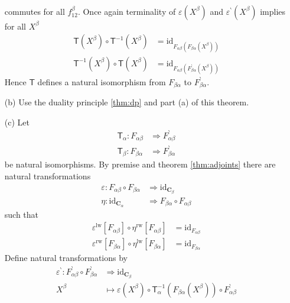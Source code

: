 \begin{prf}
\begin{enumerate}
\[\begin{tikzcd}[row sep=large, column sep=5.8em]
  &
\end{tikzcd}
\]
commutes for all $f_{12}^{\beta}$. Once again terminality of $\varepsilon(X^{\beta})$ and $\varepsilon^{\backprime}(X^{\beta})$ implies for all $X^{\beta}$
\begin{align*}
  \mathsf{T}(X^{\beta})
  \circ
  \mathsf{T}^{-1}(X^{\beta})
  &=
  \mathrm{id}_{F_{\alpha\beta}(F_{\beta\alpha}(X^{\beta}))}
  \\
  \mathsf{T}^{-1}(X^{\beta})
  \circ
  \mathsf{T}(X^{\beta})
  &=
  \mathrm{id}_{F_{\alpha\beta}(F_{\beta\alpha}^{\backprime}(X^{\beta}))}
\end{align*}
Hence $\mathsf{T}$ defines a natural isomorphism from $F_{\beta\alpha}$ to $F_{\beta\alpha}^{\backprime}$.
\item[(b)]
Use the duality principle \ref{thm:dp} and part (a) of this theorem.
\item[(c)]
Let
\begin{align*}
  \mathsf{T}_{\alpha}
  \colon
  F_{\alpha\beta}
  &\Rightarrow
  F_{\alpha\beta}^{\backprime}
  \\
  \mathsf{T}_{\beta}
  \colon
  F_{\beta\alpha}
  &\Rightarrow
  F_{\beta\alpha}^{\backprime}
\end{align*}
be natural isomorphisms. By premise and theorem \ref{thm:adjoints} there are natural transformations
\begin{align*}
  \varepsilon
  \colon
  F_{\alpha\beta}
  \circ
  F_{\beta\alpha}
  &\Rightarrow
  \mathrm{id}_{\mathbf{C}_{\beta}}
  \\
  \eta
  \colon
  \mathrm{id}_{\mathbf{C}_{\alpha}}
  &\Rightarrow
  F_{\beta\alpha}
  \circ
  F_{\alpha\beta}
\end{align*}
such that
\begin{align*}
  \varepsilon^{\textrm{lw}}[F_{\alpha\beta}]
  \circ
  \eta^{\textrm{rw}}[F_{\alpha\beta}]
  &=
  \mathrm{id}_{F_{\alpha\beta}}
  \\
  \varepsilon^{\textrm{rw}}[F_{\beta\alpha}]
  \circ
  \eta^{\textrm{lw}}[F_{\beta\alpha}]
  &=
  \mathrm{id}_{F_{\beta\alpha}}
\end{align*}
Define natural transformations by
\begin{align*}
  \varepsilon^{\backprime}
  \colon
  F_{\alpha\beta}^{\backprime}
  \circ
  F_{\beta\alpha}^{\backprime}
  &\Rightarrow
  \mathrm{id}_{\mathbf{C}_{\beta}}
  \\
  X^{\beta}
  &\mapsto
  \varepsilon(X^{\beta})
  \circ
  \mathsf{T}_{\alpha}^{-1}
  \left(
    F_{\beta\alpha}(X^{\beta})
  \right)
  \circ
  F_{\alpha\beta}^{\backprime}

\end{align*}
\end{enumerate}
\end{prf}
